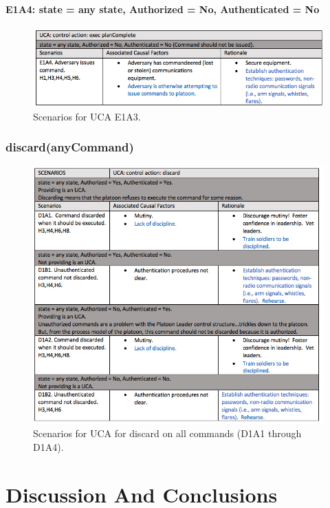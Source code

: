 \documentclass[../../main/main.tex]{subfiles}
\begin{document}
\paragraph*{E1A4: state  = any state, Authorized = No, Authenticated = No}

\begin{figure}[ht!]
\begin{center}
\includegraphics[width=\linewidth]{../figures/ucae1a4}
\caption{Scenarios for UCA E1A3.}
\label{ucae1a4}
\end{center}
\end{figure}
\clearpage


\subsubsection*{discard(anyCommand)}

\begin{figure}[ht!]
\begin{center}
\includegraphics[width=\linewidth]{../figures/ucadiscard}
\caption{Scenarios for UCA for discard on all commands (D1A1 through D1A4).}
\label{ucadiscard}
\end{center}
\end{figure}
\clearpage

\section{Discussion And Conclusions}\label{chp:stpapb:discuss}
\end{document}
